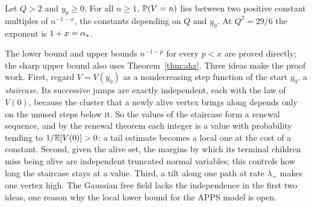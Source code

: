 \begin{theorem}\label{thm:brwlocal}
Let $Q>2$ and $y_0\ge0$. For all $n\ge1$, $\mathbb{P}(V=n)$ lies between two positive constant multiples of
$n^{-1-x}$, the constants depending on $Q$ and $y_0$. At $Q^2=29/6$ the exponent is $1+x=\alpha_*$.
\end{theorem}

The lower bound and upper bounds $n^{-1-p}$ for every $p<x$ are proved directly; the sharp upper
bound also uses Theorem~\ref{thm:ahz}. Three ideas make the proof work. First, regard $V=V(y_0)$ as a
nondecreasing step function of the start $y_0$, a \emph{staircase}. Its successive jumps are exactly
independent, each with the law of $V(0)$, because the cluster that a newly alive vertex brings
along depends only on the unused steps below it. So the values of the staircase form a renewal
sequence, and by the renewal theorem each integer is a value with probability tending to
$1/\mathbb{E}[V(0)]>0$: a tail estimate becomes a local one at the cost of a constant. Second, given the
alive set, the margins by which its terminal children miss being alive are independent truncated
normal variables; this controls how long the staircase stays at a value. Third, a tilt along one
path at rate $\lambda_+$ makes one vertex high. The Gaussian free field lacks the independence in
the first two ideas, one reason why the local lower bound for the APPS model is open.
